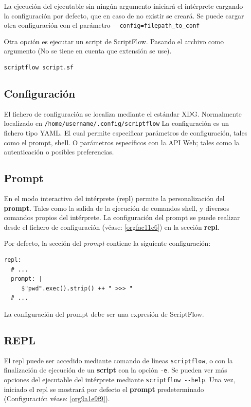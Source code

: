 \documentclass[11pt]{article}
\begin{document}
La ejecución del ejecutable sin ningún argumento iniciará el intérprete cargando la configuración por defecto, que en caso de no existir se creará.
Se puede cargar otra configuración con el parámetro \texttt{-{}-config=filepath\_to\_conf}

Otra opción es ejecutar un script de ScriptFlow. Pasando el archivo como argumento (No se tiene en cuenta que extensión se use).
\begin{verbatim}
scriptflow script.sf
\end{verbatim}

\subsection{Configuración}
\label{sec:org72ece67}

\label{orgfac11c6}
El fichero de configuración se localiza mediante el
estándar XDG. Normalmente localizado en \texttt{/home/username/.config/scriptflow}
La configuración es un fichero tipo YAML. El cual permite especificar
parámetros de configuración, tales como el prompt, shell. O parámetros
específicos con la API Web; tales como la autenticación o posibles
preferencias.

\subsection{Prompt}
\label{sec:org59e81cf}

\label{org9a1e9f9}
En el modo interactivo del intérprete (repl) permite la personalización del
\textbf{prompt}. Tales como la salida de la ejecución de comandos
shell, y diversos comandos propios del intérprete. La configuración del
prompt se puede realizar desde el fichero de configuración (véase:
\ref{orgfac11c6}) en la sección \textbf{repl}.

Por defecto, la sección del \emph{prompt} contiene la siguiente configuración:

\begin{verbatim}
repl:
  # ...
  prompt: |
     $"pwd".exec().strip() ++ " >>> "
  # ...
\end{verbatim}

La configuración del prompt debe ser una expresión de ScriptFlow.

\subsection{REPL}
\label{sec:org794b8f6}
El \gls{repl} puede ser accedido mediante comando de líneas \texttt{scriptflow}, o con la
finalización de ejecución de un \textbf{script} con la opción \texttt{-e}. Se pueden ver más opciones del
ejecutable del intérprete mediante \texttt{scriptflow -{}-help}. Una vez,
iniciado el \gls{repl} se mostrará por defecto el \textbf{prompt} predeterminado
(Configuración véase: \ref{org9a1e9f9}).
\end{document}
